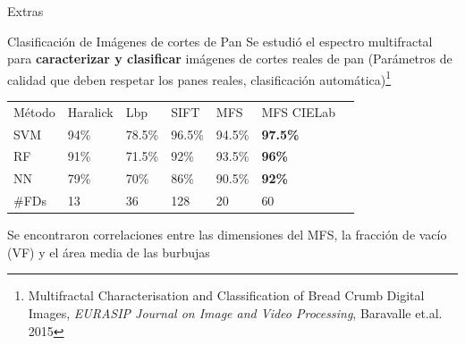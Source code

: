 \documentclass[spanish,unknownkeysallowed,10pt]{beamer}
\begin{document}
\begin{frame}
\begin{block}{}
\begin{center}
\vspace{1cm}
\huge{Extras}
\vspace{1cm}
\end{center}
\end{block}
\end{frame}

\begin{frame}{Clasificación de Imágenes de cortes de Pan}
Se estudió el espectro multifractal para \textbf{caracterizar y clasificar} imágenes de cortes reales de pan (Parámetros de calidad que deben respetar los panes reales, clasificación automática)\footnote{Multifractal Characterisation and Classification of Bread Crumb Digital Images, {\it EURASIP Journal on Image and Video Processing}, Baravalle et.al. 2015}

\begin{table}[h!]
\center
\begin{tabular}{lllllll}
\hline\noalign{\smallskip}
Método & Haralick & Lbp & SIFT & MFS & MFS CIELab\\
\noalign{\smallskip}\hline\noalign{\smallskip}
SVM & 94\% & 78.5\% & 96.5\% & 94.5\% & \textbf{97.5\%} \\
RF  & 91\% & 71.5\% & 92\% & 93.5\% & \textbf{96\%} \\
NN & 79\% & 70\% & 86\%  & 90.5\% & \textbf{92\%} \\
\noalign{\smallskip}\hline
\#FDs & 13 & 36 & 128 & 20 & 60\\
\hline
\end{tabular}
\label{tab:other} 
\end{table}

Se encontraron correlaciones entre las dimensiones del MFS, la fracción de vacío (VF) y el área media de las burbujas


\end{frame}
\end{document}
